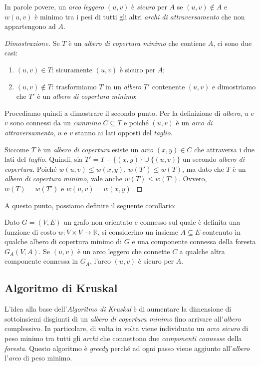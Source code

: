 \noindent
In parole povere, un \emph{arco leggero} $(u,v)$ è \emph{sicuro} per $A$ se
$(u,v)\notin A$ e $w(u, v)$ è minimo tra i pesi di tutti gli altri \emph{archi
di attraversamento} che non appartengono ad $A$.

\begin{proof}[Dimostrazione]
    Se $T$ è un \emph{albero di copertura minimo} che contiene $A$, ci sono due
    casi:
    \begin{enumerate}
        \item $(u,v)\in T$: sicuramente $(u,v)$ è sicuro per $A$;
        \item $(u,v)\notin T$: trasformiamo $T$ in un \emph{albero} $T'$
        contenente $(u,v)$ e dimostriamo che $T'$ è un \emph{albero di copertura
        minimo};
    \end{enumerate}
    Procediamo quindi a dimostrare il secondo punto. Per la definizione di
    \emph{albero}, $u$ e $v$ sono connessi da un \emph{cammino} $C\subseteq T$ e
    poiché $(u,v)$ è un \emph{arco di attraversamento}, $u$ e $v$ stanno ai lati
    opposti del \emph{taglio}.
    
    Siccome $T$ è un \emph{albero di copertura} esiste un \emph{arco} $(x,y)\in C$
    che attraversa i due lati del \emph{taglio}. Quindi, sia $T'=T-\{(x,y)\}
    \cup\{(u,v)\}$ un secondo \emph{albero di copertura}. Poiché $w(u,v)\leq
    w(x,y)$, $w(T')\leq w(T)$, ma dato che $T$ è un \emph{albero di copertura
    minimo}, vale anche $w(T)\leq w(T')$. Ovvero, $w(T)=w(T')$ e $w(u,v)=w(x,y)$.
\end{proof}

\noindent
A questo punto, possiamo definire il seguente corollario:
\begin{definition}[Corollario]
    Dato $G=(V,E)$ un grafo non orientato e connesso sul quale è definita una
    funzione di costo $w:V\times V\to\mathbb{R}$, si considerino un insieme
    $A\subseteq E$ contenuto in qualche albero di copertura minimo di $G$ e una
    componente connessa della foresta $G_A(V,A)$. Se $(u,v)$ è un arco leggero
    che connette $C$ a qualche altra componente connessa in $G_A$, l'arco $(u,v)$
    è sicuro per $A$.
\end{definition}

\subsection{Algoritmo di Kruskal}
L'idea alla base dell'\emph{Algoritmo di Kruskal} è di aumentare la dimensione
di sottoinsiemi disgiunti di un \emph{albero di copertura minimo} fino arrivare
all'\emph{albero} complessivo. In particolare, di volta in volta viene individuato
un \emph{arco sicuro} di peso minimo tra tutti gli \emph{archi} che connettono
due \emph{componenti connesse} della \emph{foresta}. Questo algoritmo è
\emph{greedy} perché ad ogni passo viene aggiunto all'\emph{albero} l'\emph{arco}
di peso minimo.

